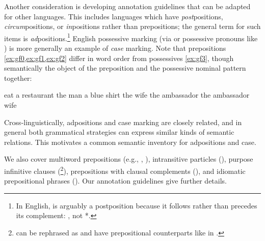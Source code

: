 \pdfoutput=1 \documentclass[11pt,a4paper]{article}
\newcommand{\longversion}[1]{#1} \newcommand{\subversion}[1]{#1} \newcommand{\draftnotice}[1]{} \newcommand{\anonversion}[1]{#1} \newcommand{\nonanonversion}[1]{}
\begin{document}
Another consideration is developing annotation guidelines that can be adapted for other languages.
This includes languages which have \emph{post}positions, \emph{circum}positions, or \emph{in}positions rather than prepositions; the general term for such items is \emph{ad}positions.\longversion{\footnote{In English,  is arguably a postposition because it follows rather than precedes its complement: \pex{five minutes \p{ago}}, not *\pex{\p{ago} five minutes}.}}
English possessive marking (via  or possessive pronouns like ) is more generally an example of \emph{case} marking. 
Note that prepositions \cref{ex:gf0,ex:gf1,ex:gf2} differ in word order from possessives \cref{ex:gf3}, though semantically the object of the preposition and the possessive 
nominal pattern together:

\begin{exe}
\ex \label{ex:ground-figure} \begin{xlist}
   \ex \label{ex:gf0} eat  a restaurant
   \ex \label{ex:gf1} the man  a blue shirt
   \ex \label{ex:gf2} the wife  the ambassador
   \ex \label{ex:gf3} the ambassador wife
\end{xlist}
\end{exe}

Cross-linguistically, adpositions and case marking are closely related, and in general both grammatical strategies can express similar kinds of semantic  relations. This motivates a common semantic inventory for adpositions and case.







We also cover multiword prepositions (e.g., , ), intransitive particles (), purpose infinitive clauses (\footnote{ can be rephrased as  and have prepositional counterparts like in .}),  prepositions with clausal complements (), and idiomatic prepositional phrases (). Our annotation guidelines give further details.
\end{document}
